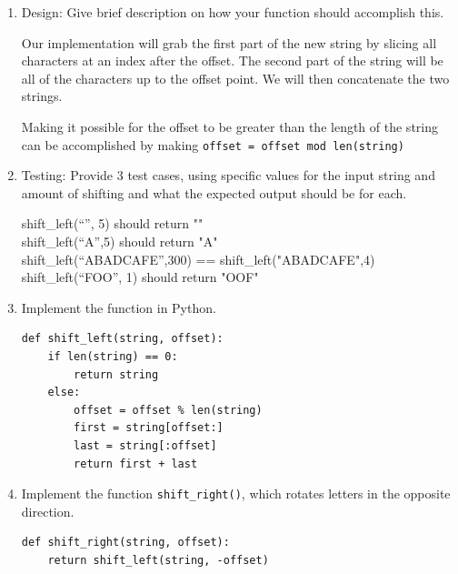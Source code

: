 \documentclass[11pt]{article}
\newenvironment{answer}{\large\lstset{basicstyle=\large}\color{white}}{}
\newenvironment{answer}{\large\lstset{basicstyle=\large}\color{red}}{}
\begin{document}
\begin{enumerate}
    \begin{enumerate}
        \item Design: Give brief description on how your function should
            accomplish this.

            \begin{answer}
            Our implementation will grab the first part of the new string by
            slicing all characters at an index after the offset. The second
            part of the string will be all of the characters up to the offset
            point. We will then concatenate the two strings.

            Making it possible for the offset to be greater than the length of
            the string can be accomplished by making {\tt offset = offset mod
            len(string)}
            \end{answer}

        \item Testing: Provide 3 test cases, using specific values for the input
            string and amount of shifting and what the expected output should be
            for each.

            \begin{answer}
                shift\_left(``'', 5) should return ""\\
                shift\_left(``A'',5) should return "A"\\
                shift\_left(``ABADCAFE'',300) == shift\_left("ABADCAFE",4)\\
                shift\_left(``FOO'', 1) should return "OOF"
            \end{answer}

        \item Implement the function in Python.

\begin{answer}
\begin{lstlisting}
def shift_left(string, offset):
    if len(string) == 0:
        return string
    else:
        offset = offset % len(string)
        first = string[offset:]
        last = string[:offset]
        return first + last
\end{lstlisting}
\end{answer}

        \item Implement the function {\tt shift\_right()}, which rotates letters
            in the opposite direction.

\begin{answer}
\begin{lstlisting}
def shift_right(string, offset):
    return shift_left(string, -offset)
\end{lstlisting}
\vspace{0.5in}
\end{answer}


\end{enumerate}
\end{enumerate}
\end{document}
